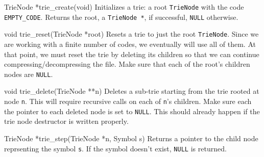 \begin{funcdoc}{TrieNode *trie\_create(void)}
  Initializes a trie: a root \texttt{TrieNode} with the code
  \texttt{EMPTY\_CODE}. Returns the root, a \texttt{TrieNode *}, if
  successful, \texttt{NULL} otherwise.
\end{funcdoc}

\begin{funcdoc}{void trie\_reset(TrieNode *root)}
  Resets a trie to just the root \texttt{TrieNode}. Since we are working with a
  finite number of codes, we eventually will use all of them. At that point, we
  must reset the trie by deleting its children so that we can continue
  compressing/decompressing the file. Make sure that each of the root's children
  nodes are \texttt{NULL}.
\end{funcdoc}

\begin{funcdoc}{void trie\_delete(TrieNode **n)}
  Deletes a sub-trie starting from the trie rooted at node \texttt{n}. This will
  require recursive calls on each of \texttt{n}'s children. Make sure each
  the pointer to each deleted node is set to \texttt{NULL}. This should already
  happen if the trie node destructor is written properly.
\end{funcdoc}

\begin{funcdoc}{TrieNode *trie\_step(TrieNode *n, Symbol s)}
  Returns a pointer to the child node reprsenting the symbol \texttt{s}. If the
  symbol doesn't exist, \texttt{NULL} is returned.
\end{funcdoc}
